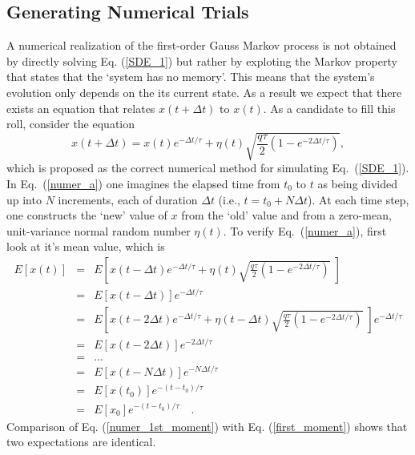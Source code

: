 \documentclass[10pt]{article}
\begin{document}
\subsection{Generating Numerical Trials}

A numerical realization of the first-order Gauss Markov process is not obtained by directly solving 
Eq. (\ref{SDE_1}) but rather by exploting the Markov property that states that the `system has no 
memory'.  This means that the system's evolution only depends on the its current state.  As a result 
we expect that there exists an equation that relates $x(t+\Delta t)$ to $x(t)$.  As a candidate
to fill this roll, consider the equation
\begin{equation}\label{numer_a}
  x (t + \Delta t) = x(t) e^{-\Delta t/\tau} + \eta(t) \sqrt{ \frac{q\tau}{2} \left(1-e^{- 2 \Delta t/\tau}\right) },
\end{equation}
which is proposed as the correct numerical method for simulating Eq.\ (\ref{SDE_1}).  In Eq.\ (\ref{numer_a}) one imagines the 
elapsed time from $t_{0}$ to $t$ as being divided up into $N$ increments, each of duration $\Delta t$ 
(i.e., $t = t_{0} + N \Delta t$). At each time step, one constructs the `new' value of $x$ from the 
`old' value and from a zero-mean, unit-variance normal random number $\eta(t)$. To verify Eq.\ (\ref{numer_a}),
first look at it's mean value, which is
\begin{eqnarray}\label{numer_1st_moment}
  E\left[x (t) \right]          & = &  E\left[ x(t - \Delta t ) e^{-\Delta t/\tau} + \eta(t) \sqrt{\frac{q\tau}{2} \left(1-e^{-2 \Delta t/\tau}\right)}\; \right] \nonumber \\
					    	    & = &  E\left[ x(t -  \Delta t) \right] e^{- \Delta t/\tau} \nonumber \\
                                & = &  E\left[ x(t- 2 \Delta t) e^{- \Delta t/\tau} + \eta(t-\Delta t) 
								        \sqrt{\frac{q\tau}{2} \left(1-e^{-2 \Delta t/\tau}\right)}
										\; \right] e^{- \Delta t/\tau} \nonumber \\
                                & = &  E\left[ x(t - 2 \Delta t) \right] e^{-2 \Delta t/\tau} \nonumber \\
								& = &  ... \nonumber \\
								& = &  E\left[ x(t-N \Delta t) \right] e^{-N \Delta t/\tau} \nonumber \\
								& = &  E\left[ x(t_{0}) \right]  e^{-(t - t_{0})/\tau} \nonumber \\
								& = &  E\left[ x_0      \right]  e^{-(t - t_{0})/\tau}\quad .
\end{eqnarray}
Comparison of Eq. (\ref{numer_1st_moment}) with Eq. (\ref{first_moment}) shows that two expectations are identical.
\end{document}
